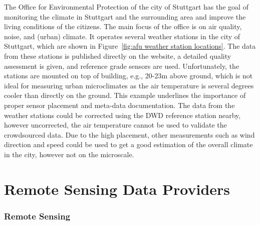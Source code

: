The Office for Environmental Protection of the city of Stuttgart has the goal of monitoring the climate in Stuttgart and the surrounding area and improve the living conditions of the citizens. The main focus of the office is on air quality, noise, and (urban) climate. It operates several weather stations in the city of Stuttgart, which are shown in Figure~\ref{fig:afu weather station locations}. The data from these stations is published directly on the website, a detailed quality assessment is given, and reference grade sensors are used. Unfortunately, the stations are mounted on top of building, e.g., 20-23m above ground, which is not ideal for measuring urban microclimates as the air temperature is several degrees cooler than directly on the ground. This example underlines the importance of proper sensor placement and meta-data documentation. The data from the weather stations could be corrected using the DWD reference station nearby, however uncorrected, the air temperature cannot be used to validate the crowdsourced data. Due to the high placement, other measurements such as wind direction and speed could be used to get a good estimation of the overall climate in the city, however not on the microscale.

\section{Remote Sensing Data Providers}

\subsubsection{Remote Sensing}
\label{subsec: remote sensing}

